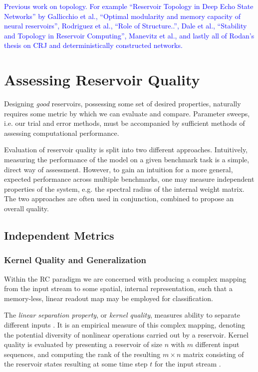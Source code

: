 \textcolor{blue}{
  Previous work on topology. For example ``Reservoir Topology in Deep Echo State
Networks'' by Gallicchio et al., ``Optimal modularity and memory capacity of
neural reservoirs'', Rodriguez et al., ``Role of Structure..'', Dale et al.,
``Stability and Topology in Reservoir Computing'', Manevitz et al., and lastly
all of Rodan's thesis on CRJ and deterministically constructed networks.
}

\section{Assessing Reservoir Quality}

Designing \textit{good} reservoirs, possessing some set of desired properties,
naturally requires some metric by which we can evaluate and compare. Parameter
sweeps, i.e. our trial and error methods, must be accompanied by sufficient
methods of assessing computational performance.

Evaluation of reservoir quality is split into two different
approaches. Intuitively, measuring the performance of the model on a given
benchmark task is a simple, direct way of assessment. However, to gain an
intuition for a more general, expected performance across multiple benchmarks,
one may measure independent properties of the system, e.g. the spectral radius
of the internal weight matrix. The two approaches are often used in conjunction,
combined to propose an overall quality.

\subsection{Independent Metrics}

\subsubsection{Kernel Quality and Generalization}

Within the RC paradigm we are concerned with producing a complex mapping from
the input stream to some spatial, internal representation, such that a
memory-less, linear readout map may be employed for classification.

The \textit{linear separation property}, or \textit{kernel quality}, measures
ability to separate different inputs \cite{legenstein_edge_2007}. It is an
empirical measure of this complex mapping, denoting the potential diversity of
nonlinear operations carried out by a reservoir. Kernel quality is evaluated by
presenting a reservoir of size $n$ with $m$ different input sequences, and
computing the rank of the resulting $m\times n$ matrix consisting of the
reservoir states resulting at some time step $t$ for the input stream
\cite{busing_connectivity_2010}.

